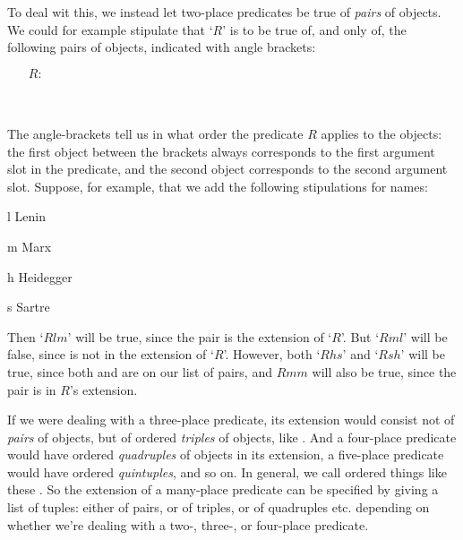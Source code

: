 To deal wit this, we instead let two-place predicates be true of \emph{pairs} of objects. We could for example stipulate that `$R$' is to be true of, and only of, the following pairs of objects, indicated with angle brackets:
	\begin{center}
	\begin{itemize}
		\item[$R:$] \\
		\\
		\\
	\end{itemize}
	\end{center}
The angle-brackets tell us in what order the predicate $R$ applies to the objects: the first object between the brackets always corresponds to the first argument slot in the predicate, and the second object corresponds to the second argument slot. Suppose, for example, that we add the following stipulations for names:
	\begin{ekey}
		\item[l] Lenin
		\item[m] Marx
		\item[h] Heidegger
		\item[s] Sartre
	\end{ekey}
Then `$Rlm$' will be true, since the pair  is the extension of `$R$'. But `$Rml$' will be false, since  is not in the extension of `$R$'. However, both `$Rhs$' and `$Rsh$' will be true, since both  and  are on our list of pairs, and $Rmm$ will also be true, since the pair  is in $R$'s extension.

If we were dealing with a three-place predicate, its extension would consist not of \emph{pairs} of objects, but of ordered \emph{triples} of objects, like .  And a four-place predicate would have ordered \emph{quadruples} of objects in its extension, a five-place predicate would have ordered \emph{quintuples}, and so on.  In general, we call ordered things like these .  So the extension of a many-place predicate can be specified by giving a list of tuples: either of pairs, or of triples, or of quadruples etc. depending on whether we're dealing with a two-, three-, or four-place predicate.



